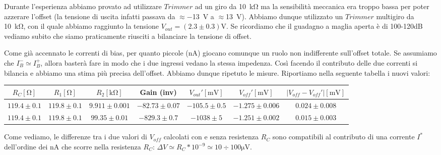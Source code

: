 Durante l'esperienza abbiamo provato ad utilizzare $Trimmer$ ad un giro da \SI{10}{\kilo\ohm} ma la sensibilità meccanica era troppo bassa per poter azzerare l'offset (la tensione di uscita infatti passava da $\approx$\SI{-13}{\volt} a $\approx$\SI{+13}{\volt}). Abbiamo dunque utilizzato un $Trimmer$ multigiro da \SI{10}{\kilo\ohm}, con il quale abbiamo raggiunto la tensione $V_{out}= (2.3\pm0.3)\si{\volt}$. Se ricordiamo che il guadagno a maglia aperta è di 100-120dB vediamo subito che siamo praticamente riusciti a bilanciare la tensione di offset.

Come già accennato le correnti di bias, per quanto piccole (\si{\nano\ampere}) giocano comunque un ruolo non indifferente sull'offset totale. Se assumiamo che $I_B^- \simeq I_B^+ $, allora basterà fare in modo che i due ingressi vedano la stessa impedenza. Così facendo il contributo delle due correnti si bilancia e abbiamo una stima più precisa dell'offset. Abbiamo dunque ripetuto le misure. Riportiamo nella seguente tabella i nuovi valori:



\begin{tabular}{c|c|c|c|c|c|c}
$R_C [\si{\ohm}]$& $R_1[\si{\ohm}]$ & $R_2[\si{\kilo\ohm}]$ & Gain (inv) & $V_{out}' [\si{\milli\volt}]$ & $V_{off}' [\si{\milli\volt}]$ & $|V_{off}-V_{off}'|[\si{\milli\volt}]$ \\ 
\hline 
$119.4\pm0.1$ & $119.8\pm0.1$ & $9.911\pm0.001$  & $-82.73\pm0.07$ & $-105.5 \pm 0.5$ & $-1.275 \pm0.006$ & $0.024\pm0.008$ \\
\hline
$119.4\pm0.1$ & $119.8\pm0.1$ & $99.35\pm0.01$  & $-829.3\pm0.7$ &$ -1038 \pm 5$ & $-1.251 \pm 0.002$ & $0.015 \pm 0.003 $	\\

\end{tabular}


Come vediamo, le differenze tra i due valori di $V_{off}$ calcolati con e senza resistenza $R_C$ sono compatibili al contributo di una corrente $I^*$ dell'ordine dei \si{\nano\ampere} che scorre nella resistenza $R_C$: $\Delta V \simeq R_C * 10^{-9} \simeq 10\div100 \si{\micro\volt}$.

